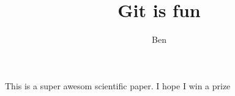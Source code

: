 \documentclass[10pt]{article}
\author{Ben}
\title{Git is fun}
\begin{document}
    \maketitle

    This is a super awesom scientific paper.
    I hope I win a prize
\end{document}
